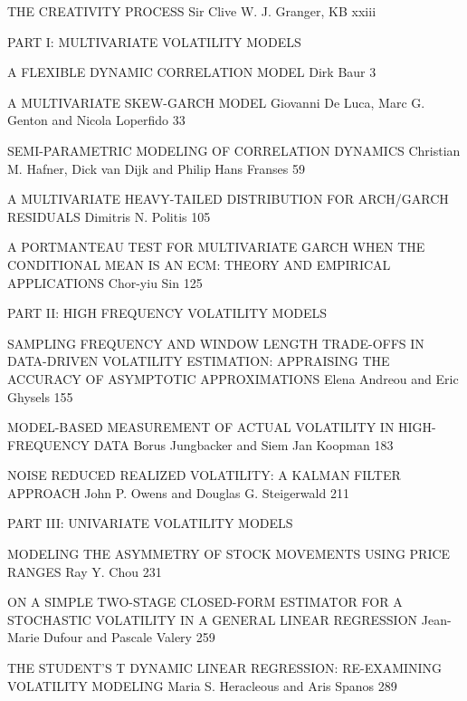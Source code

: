 THE CREATIVITY PROCESS
Sir Clive W. J. Granger, KB xxiii



PART I: MULTIVARIATE VOLATILITY MODELS



A FLEXIBLE DYNAMIC CORRELATION MODEL
Dirk Baur 3



A MULTIVARIATE SKEW-GARCH MODEL
Giovanni De Luca, Marc G. Genton and Nicola Loperfido 33



SEMI-PARAMETRIC MODELING OF CORRELATION DYNAMICS
Christian M. Hafner, Dick van Dijk and Philip Hans Franses 59



A MULTIVARIATE HEAVY-TAILED DISTRIBUTION FOR ARCH/GARCH RESIDUALS
Dimitris N. Politis 105



A PORTMANTEAU TEST FOR MULTIVARIATE GARCH WHEN THE CONDITIONAL MEAN IS AN ECM: THEORY AND EMPIRICAL APPLICATIONS
Chor-yiu Sin 125



PART II: HIGH FREQUENCY VOLATILITY MODELS



SAMPLING FREQUENCY AND WINDOW LENGTH TRADE-OFFS IN DATA-DRIVEN VOLATILITY ESTIMATION: APPRAISING THE ACCURACY OF ASYMPTOTIC APPROXIMATIONS
Elena Andreou and Eric Ghysels 155



MODEL-BASED MEASUREMENT OF ACTUAL VOLATILITY IN HIGH-FREQUENCY DATA
Borus Jungbacker and Siem Jan Koopman 183



NOISE REDUCED REALIZED VOLATILITY: A KALMAN FILTER APPROACH
John P. Owens and Douglas G. Steigerwald 211



PART III: UNIVARIATE VOLATILITY MODELS



MODELING THE ASYMMETRY OF STOCK MOVEMENTS USING PRICE RANGES
Ray Y. Chou 231



ON A SIMPLE TWO-STAGE CLOSED-FORM ESTIMATOR FOR A STOCHASTIC VOLATILITY IN A GENERAL LINEAR REGRESSION
Jean-Marie Dufour and Pascale Valery 259



THE STUDENT'S T DYNAMIC LINEAR REGRESSION: RE-EXAMINING VOLATILITY MODELING
Maria S. Heracleous and Aris Spanos 289



